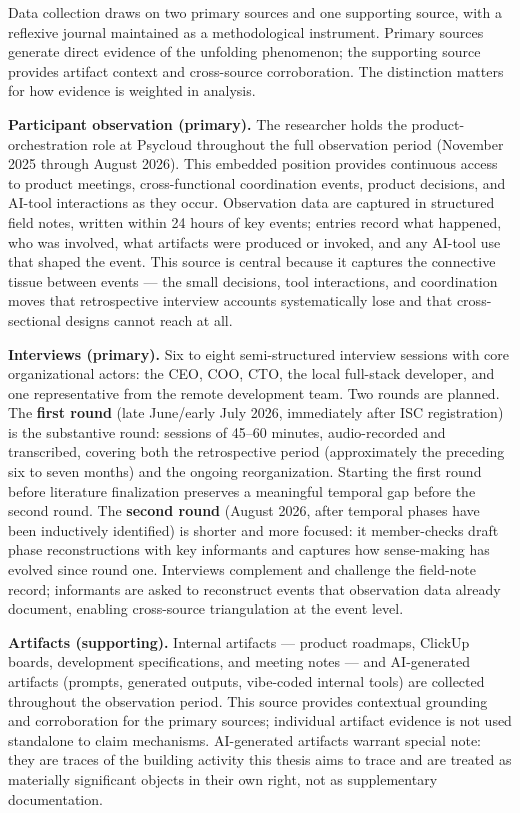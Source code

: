 \documentclass[11pt,a4paper]{article}
\begin{document}
Data collection draws on two primary sources and one supporting source,
with a reflexive journal maintained as a methodological instrument.
Primary sources generate direct evidence of the unfolding phenomenon;
the supporting source provides artifact context and cross-source
corroboration. The distinction matters for how evidence is weighted
in analysis.

\textbf{Participant observation (primary).} The researcher holds the
product-orchestration role at Psycloud throughout the full observation
period (November 2025 through August 2026). This embedded position
provides continuous access to product meetings, cross-functional
coordination events, product decisions, and AI-tool interactions as they
occur. Observation data are captured in structured field notes, written
within 24 hours of key events; entries record what happened, who was
involved, what artifacts were produced or invoked, and any AI-tool use
that shaped the event. This source is central because it captures the
connective tissue between events --- the small decisions, tool interactions,
and coordination moves that retrospective interview accounts systematically
lose and that cross-sectional designs cannot reach at all.

\textbf{Interviews (primary).} Six to eight semi-structured interview
sessions with core organizational actors: the CEO, COO, CTO, the local
full-stack developer, and one representative from the remote development
team. Two rounds are planned. The \textbf{first round} (late June/early
July 2026, immediately after ISC registration) is the substantive round:
sessions of 45--60 minutes, audio-recorded and transcribed, covering both
the retrospective period (approximately the preceding six to seven months)
and the ongoing reorganization. Starting the first round before literature
finalization preserves a meaningful temporal gap before the second round.
The \textbf{second round} (August 2026, after temporal phases have been
inductively identified) is shorter and more focused: it member-checks draft
phase reconstructions with key informants and captures how sense-making has
evolved since round one. Interviews complement and challenge the field-note
record; informants are asked to reconstruct events that observation data
already document, enabling cross-source triangulation at the event level.

\textbf{Artifacts (supporting).} Internal artifacts --- product roadmaps,
ClickUp boards, development specifications, and meeting notes --- and
AI-generated artifacts (prompts, generated outputs, vibe-coded internal
tools) are collected throughout the observation period. This source
provides contextual grounding and corroboration for the primary sources;
individual artifact evidence is not used standalone to claim mechanisms.
AI-generated artifacts warrant special note: they are traces of the
building activity this thesis aims to trace and are treated as materially
significant objects in their own right, not as supplementary documentation.
\end{document}
